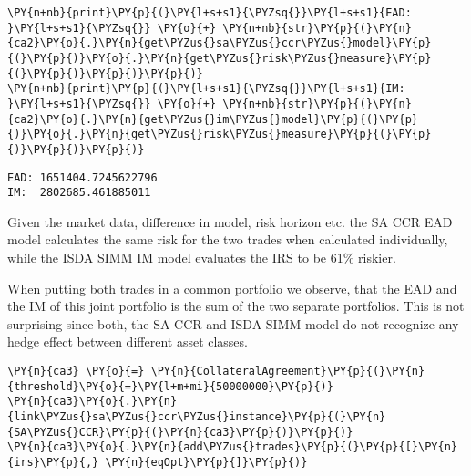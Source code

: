     \begin{tcolorbox}[breakable, size=fbox, boxrule=1pt, pad at break*=1mm,colback=cellbackground, colframe=cellborder]
\begin{Verbatim}[commandchars=\\\{\}]
\PY{n+nb}{print}\PY{p}{(}\PY{l+s+s1}{\PYZsq{}}\PY{l+s+s1}{EAD: }\PY{l+s+s1}{\PYZsq{}} \PY{o}{+} \PY{n+nb}{str}\PY{p}{(}\PY{n}{ca2}\PY{o}{.}\PY{n}{get\PYZus{}sa\PYZus{}ccr\PYZus{}model}\PY{p}{(}\PY{p}{)}\PY{o}{.}\PY{n}{get\PYZus{}risk\PYZus{}measure}\PY{p}{(}\PY{p}{)}\PY{p}{)}\PY{p}{)}
\PY{n+nb}{print}\PY{p}{(}\PY{l+s+s1}{\PYZsq{}}\PY{l+s+s1}{IM:  }\PY{l+s+s1}{\PYZsq{}} \PY{o}{+} \PY{n+nb}{str}\PY{p}{(}\PY{n}{ca2}\PY{o}{.}\PY{n}{get\PYZus{}im\PYZus{}model}\PY{p}{(}\PY{p}{)}\PY{o}{.}\PY{n}{get\PYZus{}risk\PYZus{}measure}\PY{p}{(}\PY{p}{)}\PY{p}{)}\PY{p}{)}
\end{Verbatim}
\end{tcolorbox}

    \begin{Verbatim}[commandchars=\\\{\}]
EAD: 1651404.7245622796
IM:  2802685.461885011
    \end{Verbatim}

    Given the market data, difference in model, risk horizon etc. the SA CCR
EAD model calculates the same risk for the two trades when calculated
individually, while the ISDA SIMM IM model evaluates the IRS to be 61\%
riskier.

    
    When putting both trades in a common portfolio we observe, that the EAD
and the IM of this joint portfolio is the sum of the two separate
portfolios. This is not surprising since both, the SA CCR and ISDA SIMM
model do not recognize any hedge effect between different asset classes.

    \begin{tcolorbox}[breakable, size=fbox, boxrule=1pt, pad at break*=1mm,colback=cellbackground, colframe=cellborder]
\begin{Verbatim}[commandchars=\\\{\}]
\PY{n}{ca3} \PY{o}{=} \PY{n}{CollateralAgreement}\PY{p}{(}\PY{n}{threshold}\PY{o}{=}\PY{l+m+mi}{50000000}\PY{p}{)}
\PY{n}{ca3}\PY{o}{.}\PY{n}{link\PYZus{}sa\PYZus{}ccr\PYZus{}instance}\PY{p}{(}\PY{n}{SA\PYZus{}CCR}\PY{p}{(}\PY{n}{ca3}\PY{p}{)}\PY{p}{)}
\PY{n}{ca3}\PY{o}{.}\PY{n}{add\PYZus{}trades}\PY{p}{(}\PY{p}{[}\PY{n}{irs}\PY{p}{,} \PY{n}{eqOpt}\PY{p}{]}\PY{p}{)}
\end{Verbatim}
\end{tcolorbox}

